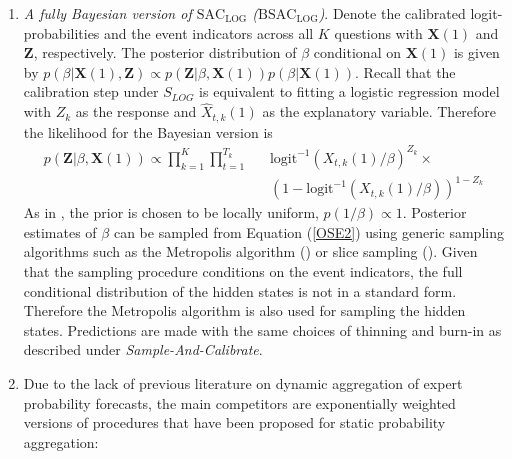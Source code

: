 \documentclass[aoas, preprint]{imsart}
\numberwithin{equation}{section}
\theoremstyle{plain}
\newcommand{\logit}{\text{logit}}
\begin{document}
\begin{enumerate}
\item \textit{A fully Bayesian version of $\text{SAC}_{\text{LOG}}$ ($\text{BSAC}_{\text{LOG}}$)}. Denote the calibrated logit-probabilities and  the event indicators across all $K$ questions with $\boldsymbol{X}(1)$ and $\boldsymbol{Z}$, respectively.  The posterior distribution of $\beta$ conditional on $\boldsymbol{X}(1)$ is given by $p(\beta | \boldsymbol{X}(1), \boldsymbol{Z}) \propto p( \boldsymbol{Z} | \beta, \boldsymbol{X}(1)) p(\beta | \boldsymbol{X}(1))$. Recall that the calibration step under $S_{LOG}$ is equivalent to fitting a logistic regression model with $Z_k$ as the response and $\hat{X}_{t,k}(1)$ as the explanatory variable. Therefore the likelihood for the Bayesian version is
\begin{eqnarray}
p( \boldsymbol{Z} | \beta, \boldsymbol{X}(1)) \propto \prod_{k=1}^K \prod_{t=1}^{T_k} && \logit^{-1} \left(X_{t,k}(1)/\beta  \right)^{Z_k}\times \label{OSE2}\\ 
&& \left( 1-  \logit^{-1} \left( X_{t,k}(1)/\beta  \right) \right)^{1-Z_k} \nonumber
\end{eqnarray}
As in \citet{gelman2003bayesian}, the prior is chosen to be locally uniform, $p(1/\beta) \propto 1$. Posterior estimates of $\beta$ can be sampled from Equation (\ref{OSE2}) using generic sampling algorithms such as the Metropolis algorithm (\citet{metropolis1953equation}) or slice sampling (\citet{neal2003slice}). Given that the sampling procedure conditions on the event indicators, the full conditional distribution of the hidden states is not in a standard form. Therefore the Metropolis algorithm is also used for sampling the hidden states. Predictions are made with the same choices of thinning and burn-in as described under \textit{Sample-And-Calibrate}.


\item Due to the lack of previous literature on dynamic aggregation of expert probability forecasts,  the main competitors are exponentially weighted versions of procedures that have been proposed for static probability aggregation:

\begin{enumerate}


\end{enumerate}
\end{enumerate}
\end{document}
